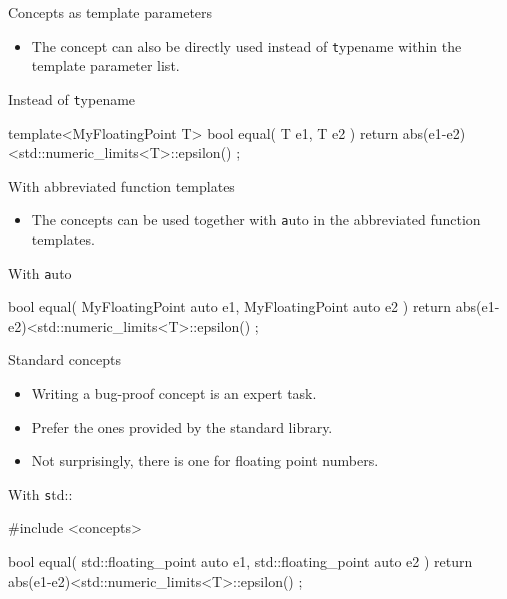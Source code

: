 \begin{frame}[fragile]
    \begin{block}{Concepts as template parameters}
      \begin{itemize}
        \item The concept can also be directly used instead of {\texttt typename} within the template parameter list.
      \end{itemize}
    \end{block}
    \begin{exampleblock}{Instead of {\texttt typename}}
      \scriptsize
      \begin{cppcode*}{}
      template<MyFloatingPoint T>
      bool equal( T e1, T e2 )
      { return abs(e1-e2)<std::numeric_limits<T>::epsilon() ; }
      \end{cppcode*}
    \end{exampleblock}
\end{frame}

\begin{frame}[fragile]
    \begin{block}{With abbreviated function templates}
      \begin{itemize}
        \item The concepts can be used together with {\texttt auto} in the abbreviated function templates.
      \end{itemize}
    \end{block}
    \begin{exampleblock}{With {\texttt auto}}
      \scriptsize
      \begin{cppcode*}{}
      bool equal( MyFloatingPoint auto e1, MyFloatingPoint auto e2 )
      { return abs(e1-e2)<std::numeric_limits<T>::epsilon() ; }
      \end{cppcode*}
    \end{exampleblock}
\end{frame}

\begin{frame}[fragile]
    \begin{block}{Standard concepts}
      \begin{itemize}
        \item Writing a bug-proof concept is an expert task.
        \item Prefer the ones provided by the standard library.
        \item Not surprisingly, there is one for floating point numbers.
      \end{itemize}
    \end{block}
    \begin{exampleblock}{With {\texttt std::}}
      \scriptsize
      \begin{cppcode*}{}
      #include <concepts>

      bool equal( std::floating_point auto e1, std::floating_point auto e2 )
      { return abs(e1-e2)<std::numeric_limits<T>::epsilon() ; }
      \end{cppcode*}
    \end{exampleblock}
\end{frame}

